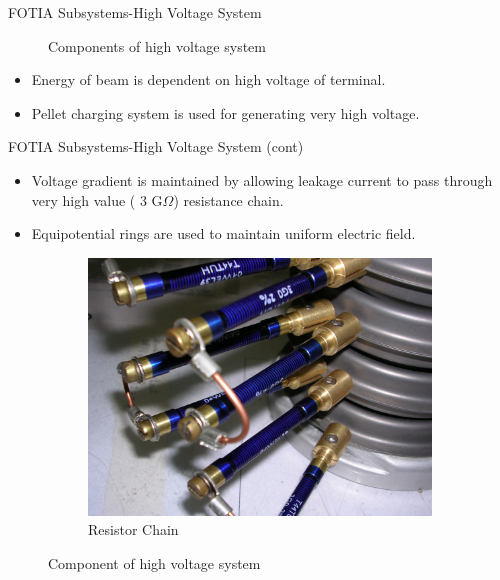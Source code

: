 \documentclass[11pt]{beamer}
\begin{document}
\begin{frame}{FOTIA Subsystems-High Voltage System}
\begin{figure}
        \caption{Components of high voltage system}\label{fig:high voltage system}
\end{figure}
  
  
  
  \begin{itemize}
      
    \item Energy of beam is dependent on high voltage of terminal.
    \item Pellet charging system is used for generating very high voltage. 
       
   \end{itemize}





\end{frame}



\begin{frame}{FOTIA Subsystems-High Voltage System (cont)}

   \begin{itemize}
    \item Voltage gradient is maintained by allowing leakage current to pass through very high value ( 3 G$ \Omega$) resistance chain.
    \item Equipotential rings are used to maintain uniform electric field.

 
    \end{itemize}

\begin{figure}
        \centering
        \begin{subfigure}[b]{0.5\textwidth}
                \includegraphics[width=\textwidth]{Resistor_chain.jpg}
                \caption{Resistor Chain}
                \label{fig:Resistor Chain}
        \end{subfigure}%
              
        \caption{Component of high voltage system}\label{fig:Component of High voltage system}
\end{figure}





\end{frame}
\end{document}
